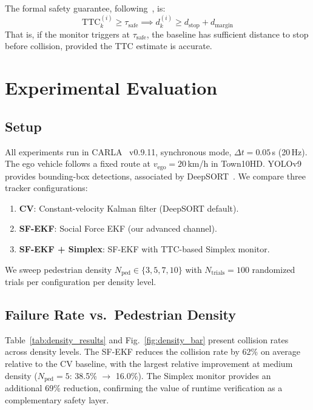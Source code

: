 \documentclass[conference]{IEEEtran}
\begin{document}
The formal safety guarantee, following~\cite{sha2001simplex}, is:
\begin{equation}
    \mathrm{TTC}_k^{(i)} \geq \tau_{\text{safe}} \implies d_k^{(i)} \geq d_{\text{stop}} + d_{\text{margin}}
\end{equation}
That is, if the monitor triggers at $\tau_{\text{safe}}$, the baseline has sufficient distance to stop before collision, provided the TTC estimate is accurate.

\section{Experimental Evaluation}
\label{sec:experiments}

\subsection{Setup}

All experiments run in CARLA~\cite{dosovitskiy2017carla} v0.9.11, synchronous mode, $\Delta t = 0.05$\,s (20\,Hz).
The ego vehicle follows a fixed route at $v_{\text{ego}} = 20$\,km/h in Town10HD.
YOLOv9~\cite{wang2024yolov9} provides bounding-box detections, associated by DeepSORT~\cite{wojke2017deepsort}.
We compare three tracker configurations:
\begin{enumerate}
    \item \textbf{CV}: Constant-velocity Kalman filter (DeepSORT default).
    \item \textbf{SF-EKF}: Social Force EKF (our advanced channel).
    \item \textbf{SF-EKF + Simplex}: SF-EKF with TTC-based Simplex monitor.
\end{enumerate}
We sweep pedestrian density $N_{\text{ped}} \in \{3, 5, 7, 10\}$ with $N_{\text{trials}} = 100$ randomized trials per configuration per density level.

\subsection{Failure Rate vs.\ Pedestrian Density}

Table~\ref{tab:density_results} and Fig.~\ref{fig:density_bar} present collision rates across density levels.
The SF-EKF reduces the collision rate by 62\% on average relative to the CV baseline, with the largest relative improvement at medium density ($N_{\text{ped}} = 5$: 38.5\% $\to$ 16.0\%).
The Simplex monitor provides an additional 69\% reduction, confirming the value of runtime verification as a complementary safety layer.
\end{document}
